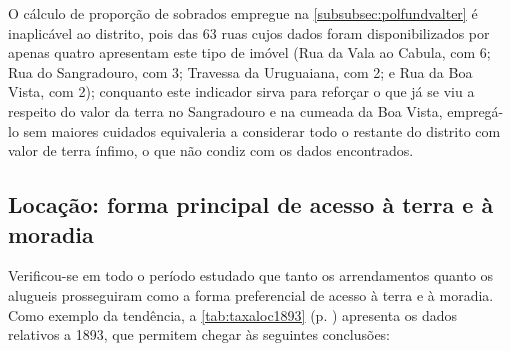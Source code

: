 O cálculo de proporção de sobrados empregue na \autoref{subsubsec:polfundvalter} é inaplicável ao distrito, pois das 63 ruas cujos dados foram disponibilizados por  apenas quatro apresentam este tipo de imóvel (Rua da Vala ao Cabula, com 6; Rua do Sangradouro, com 3; Travessa da Uruguaiana, com 2; e Rua da Boa Vista, com 2); conquanto este indicador sirva para reforçar o que já se viu a respeito do valor da terra no Sangradouro e na cumeada da Boa Vista, empregá-lo sem maiores cuidados equivaleria a considerar todo o restante do distrito com valor de terra ínfimo, o que não condiz com os dados encontrados. 



\subsection{Locação: forma principal de acesso à terra e à moradia}\label{subsec:locatermor}

Verificou-se em todo o período estudado que tanto os arrendamentos quanto os alugueis prosseguiram como a forma preferencial de acesso à terra e à moradia. Como exemplo da tendência, a \autoref{tab:taxaloc1893} (p. \pageref{tab:taxaloc1893}) apresenta os dados relativos a 1893, que permitem chegar às seguintes conclusões:



